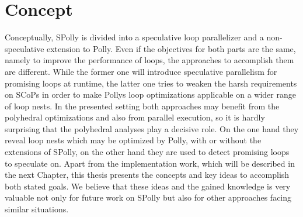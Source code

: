 
\chapter{Concept} %
\label{Chapter3}

Conceptually, SPolly is divided into a speculative loop parallelizer 
and a non-speculative extension to Polly. Even if the objectives for both parts 
are the same, namely to improve the performance of loops, the approaches to accomplish 
them are different. While the former one will introduce speculative parallelism
for promising loops at runtime, the latter one tries to weaken the harsh 
requirements on SCoPs in order to make Pollys loop optimizations applicable on
a wider range of loop nests. In the presented setting both approaches may benefit
from the polyhedral optimizations and also from parallel execution, so it is 
hardly surprising that the polyhedral analyses play a decisive role. 
On the one hand they reveal loop nests which may be optimized by Polly, with or
without the extensions of SPolly, on the other hand they are used to detect 
promising loops to speculate on.
Apart from the implementation work, which will be described in the 
next Chapter, this thesis presents the concepts and key ideas to accomplish both
stated goals.
We believe that these ideas and the gained knowledge is very 
valuable not only for future work on SPolly  but also for
other approaches facing similar situations.





